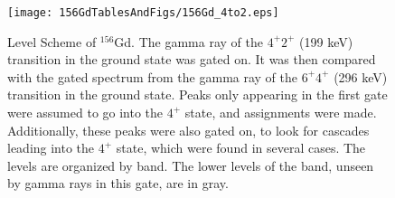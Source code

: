 \begin{landscape}
\begin{figure}
    \centering
    \texttt{[image: 156GdTablesAndFigs/156Gd\_4to2.eps]}
    \caption{Level Scheme of $^{156}$Gd. The gamma ray of the $4^+$\rightarrow$2^+$ (199 keV) transition in the ground state was gated on. It was then compared with the gated spectrum from the gamma ray of the $6^+$\rightarrow$4^+$ (296 keV) transition in the ground state. Peaks only appearing in the first gate were assumed to go into the $4^+$ state, and assignments were made. Additionally, these peaks were also gated on, to look for cascades leading into the $4^+$ state, which were found in several cases. The levels are organized by band. The lower levels of the band, unseen by gamma rays in this gate, are in gray.}
    \label{fig:156_4to2}
\end{figure}
\end{landscape}